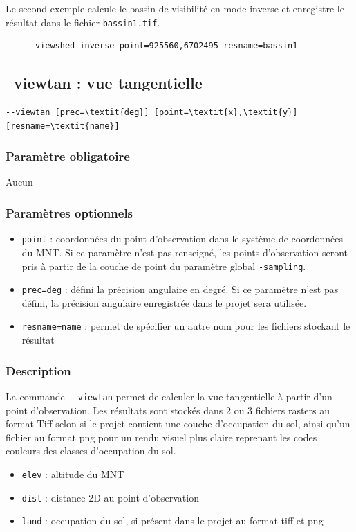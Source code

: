 \documentclass{report}
\begin{document}
Le second exemple calcule le bassin de visibilité en mode inverse et enregistre le résultat dans le fichier \verb|bassin1.tif|.
\begin{Verbatim}
	--viewshed inverse point=925560,6702495 resname=bassin1
\end{Verbatim}


\subsection{--viewtan : vue tangentielle}
\begin{Verbatim}[commandchars=\\\{\}]
--viewtan [prec=\textit{deg}] [point=\textit{x},\textit{y}] [resname=\textit{name}]
\end{Verbatim}

\subsubsection{Paramètre obligatoire}
Aucun

\subsubsection{Paramètres optionnels}
\begin{itemize}
	\item \verb|point| : coordonnées du point d'observation dans le système de coordonnées du MNT. Si ce paramètre n'est pas renseigné, les points d'observation seront pris à partir de la couche de point du paramètre global \verb|-sampling|.
	\item \verb|prec=deg| : défini la précision angulaire en degré. Si ce paramètre n'est pas défini, la précision angulaire enregistrée dans le projet sera utilisée.
	\item \verb|resname=name| : permet de spécifier un autre nom pour les fichiers stockant le résultat
\end{itemize}

\subsubsection{Description}
La commande \verb|--viewtan| permet de calculer la vue tangentielle à partir d'un point d'observation. Les résultats sont stockés dans 2 ou 3 fichiers rasters au format Tiff selon si le projet contient une couche d'occupation du sol, ainsi qu'un fichier au format png pour un rendu visuel plus claire reprenant les codes couleurs des classes d'occupation du sol.
\begin{itemize}
	\item \verb|elev| : altitude du MNT
	\item \verb|dist| : distance 2D au point d'observation
	\item \verb|land| : occupation du sol, si présent dans le projet au format tiff et png
\end{itemize}
\end{document}
